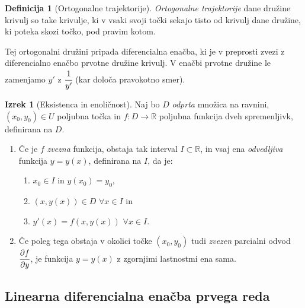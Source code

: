 \documentclass[11pt]{article}
\newcommand{\R}{\mathbb{R}}
\theoremstyle{definition}
\newtheorem{definicija}{Definicija}[section]
\theoremstyle{definition}
\theoremstyle{definition}
\newtheorem{izrek}{Izrek}[section]
\theoremstyle{theorem}
\begin{document}
\begin{definicija}[Ortogonalne trajektorije]

\textit{Ortogonalne trajektorije} dane družine krivulj so take krivulje, ki v vsaki svoji točki sekajo tisto od krivulj dane družine, ki poteka skozi točko, pod pravim kotom.

Tej ortogonalni družini pripada diferencialna enačba, ki je v preprosti zvezi z diferencialno enačbo prvotne družine krivulj. V enačbi prvotne družine le zamenjamo $y'$ z $\cfrac{1}{y'}$ (kar določa pravokotno smer).

\end{definicija}
\vspace{0.5cm}

\begin{izrek}[Eksistenca in enoličnost]

Naj bo $D$ \textit{odprta} množica na ravnini, $(x_0, y_0) \in U$ poljubna točka in $f: D \rightarrow \R$ poljubna funkcija dveh spremenljivk, definirana na $D$.
\begin{enumerate}
	
	\item[(1)] Če je $f$ \textit{zvezna} funkcija, obstaja tak interval $I \subset \R$, in vsaj ena \textit{odvedljiva} funkcija $y = y(x)$, definirana na $I$, da je:
	\begin{enumerate}
		\item[(i)] $x_0 \in I$ in $y(x_0) = y_0$,
		\item[(ii)] $(x, y(x)) \in D$ $\forall x \in I$ in
		\item[(iii)] $y'(x) = f(x, y(x))$ $\forall x \in I$. 
	\end{enumerate}		
	
	\item[(2)] Če poleg tega obstaja v okolici točke $(x_0, y_0)$ tudi \textit{zvezen} parcialni odvod $\cfrac{\partial f}{\partial y}$, je funkcija $y = y(x)$ z zgornjimi lastnostmi ena sama.
	
\end{enumerate}

\end{izrek}
\vspace{0.5cm}


\subsection{Linearna diferencialna enačba prvega reda}
\vspace{0.5cm}
\end{document}
